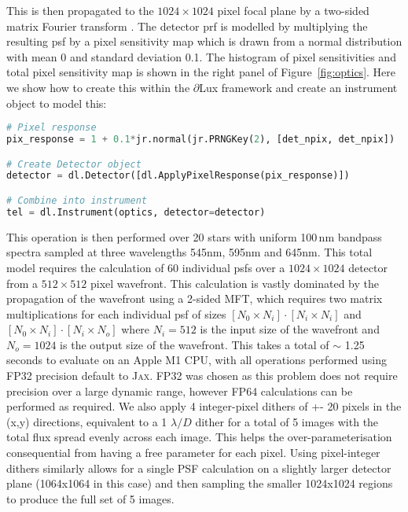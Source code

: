 \documentclass[]{spieman}
\newcommand\jax{\textsc{Jax}\xspace}
\begin{document}
\newpage


This is then propagated to the $1024\times1024$ pixel focal plane by a two-sided matrix Fourier transform \cite{Soummer2007,Martinache2020}. The detector \ac{prf} is modelled by multiplying the resulting \ac{psf} by a pixel sensitivity map which is drawn from a normal distribution with mean 0 and standard deviation 0.1. The histogram of pixel sensitivities and total pixel sensitivity map is shown in the right panel of Figure~\ref{fig:optics}. Here we show how to create this within the $\partial$Lux framework and create an instrument object to model this:

\begin{lstlisting}[language=Python,frame=single]
# Pixel response
pix_response = 1 + 0.1*jr.normal(jr.PRNGKey(2), [det_npix, det_npix])

# Create Detector object
detector = dl.Detector([dl.ApplyPixelResponse(pix_response)])

# Combine into instrument
tel = dl.Instrument(optics, detector=detector)
\end{lstlisting}

This operation is then performed over 20 stars with uniform 100\,nm bandpass spectra sampled at three wavelengths 545nm, 595nm and 645nm. This total model requires the calculation of 60 individual \ac{psf}s over a $1024\times1024$ detector from a $512\times512$ pixel wavefront. This calculation is vastly dominated by the propagation of the wavefront using a 2-sided MFT, which requires two matrix multiplications for each individual \ac{psf} of sizes $[N_0 \times N_i] \cdot [N_i \times N_i]$ and $[N_0 \times N_i] \cdot [N_i \times N_o]$ where $N_i = 512$ is the input size of the wavefront and $N_o = 1024$ is the output size of the wavefront. This takes a total of $\sim$ 1.25 seconds to evaluate on an Apple M1 CPU, with all operations performed using FP32 precision default to \jax. FP32 was chosen as this problem does not require precision over a large dynamic range, however FP64 calculations can be performed as required. We also apply 4 integer-pixel dithers of +- 20 pixels in the (x,y) directions, equivalent to a 1 $\lambda/D$ dither for a total of 5 images with the total flux spread evenly across each image. This helps the over-parameterisation consequential from having a free parameter for each pixel. Using pixel-integer dithers similarly allows for a single PSF calculation on a slightly larger detector plane (1064x1064 in this case) and then sampling the smaller 1024x1024 regions to produce the full set of 5 images.
\end{document}
